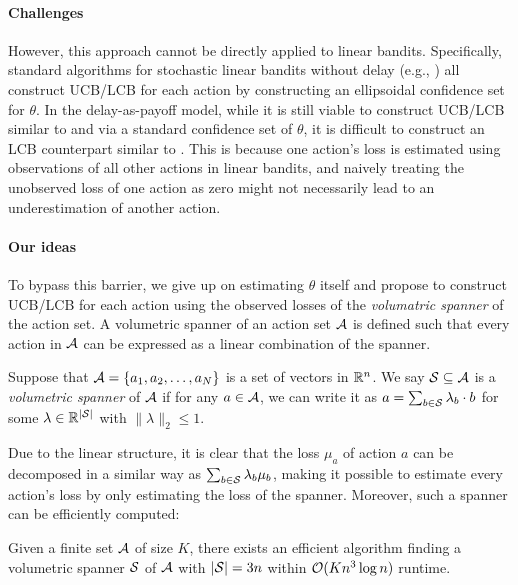 \paragraph{Challenges} However, this approach cannot be directly applied to linear bandits. Specifically, standard algorithms for stochastic linear bandits without delay (e.g., \citet{li2010contextual,abbasi2011improved}) all construct  UCB/LCB for each action by constructing an ellipsoidal confidence set for $\theta$. In the delay-as-payoff model, while it is still viable to construct UCB/LCB similar to  and  via a standard confidence set of $\theta$, it is difficult to construct an LCB counterpart similar to .
This is because one action's loss is estimated using observations of all other actions in linear bandits, and naively treating the unobserved loss of one action as zero might not necessarily lead to an underestimation of another action. 

\paragraph{Our ideas} To bypass this barrier, we give up on estimating $\theta$ itself and propose to construct UCB/LCB for each action using the observed losses of the \emph{volumatric spanner} of the action set. A volumetric spanner of an action set ${\mathcal{A}}$ is defined such that every action in ${\mathcal{A}}$ can be expressed as a linear combination of the spanner. 

\begin{definition}\label{def:volume}
Suppose that ${\mathcal{A}} = \{a_1, a_2, \dots , a_N\}$ is a set of vectors in $\mathbb{R}^n$. We say ${\mathcal{S}}\subseteq {\mathcal{A}}$ is a \emph{volumetric spanner} of ${\mathcal{A}}$ if for any $a\in {\mathcal{A}}$, we can write it as $a=\sum_{b\in {\mathcal{S}}}\lambda_b\cdot b$ for some $\lambda\in \mathbb{R}^{|{\mathcal{S}}|}$ with $\|\lambda\|_2\leq 1$. 
\end{definition}

Due to the linear structure, it is clear that the loss $\mu_a$ of action $a$ can be decomposed in a similar way as $\sum_{b\in {\mathcal{S}}}\lambda_b \mu_b$,
making it possible to estimate every action's loss by only estimating the loss of the spanner.
Moreover, such a spanner can be efficiently computed:
\begin{proposition}\label{prop:volume}
Given a finite set ${\mathcal{A}}$ of size $K$, there exists an efficient algorithm finding a volumetric spanner ${\mathcal{S}}$ of ${\mathcal{A}}$ with $|{\mathcal{S}}|=3n$ within $\mathcal{O}(Kn^3\log n)$ runtime.
\end{proposition}

